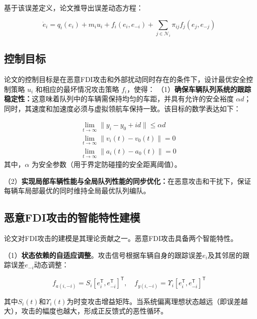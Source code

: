 \documentclass[10.5pt,a4paper,twoside,twocolumn]{ctexart}
\newcommand{\T}{\mathsf{T}}
\begin{document}
基于该误差定义，论文推导出误差动态方程：

\begin{equation}
\dot{e}_i = q_i(e_i) + m_i u_i + f_i(e_i, e_{-i}) + \sum_{j\in\mathcal{N}_i} \pi_{ij} f_j(e_j, e_{-j})
\label{eq:wcdt}
\end{equation}

\subsection{\heiti{} 控制目标}
论文的控制目标是在恶意FDI攻击和外部扰动同时存在的条件下，设计最优安全控制策略 $u_i$ 和相应的最坏情况攻击策略 $f_i$，使得：
（1）\textbf{确保车辆队列系统的跟踪稳定性：}这意味着队列中的车辆需保持均匀的车距，并具有允许的安全裕度 $\alpha d$；同时，其速度和加速度必须与虚拟领航车保持一致。该目标的数学表达如下：

\begin{equation}
	\begin{aligned}
	& \lim_{t \to \infty} \|y_i - y_0 + id\| \le \alpha d \\
	& \lim_{t \to \infty} \|v_i(t) - v_0(t)\| = 0 \\
	& \lim_{t \to \infty} \|a_i(t) - a_0(t)\| = 0 \quad
    \end{aligned}
\end{equation}
其中，$\alpha$ 为安全参数（用于界定防碰撞的安全距离阈值）。

（2）\textbf{实现局部车辆性能与全局队列性能的同步优化：}在恶意攻击和干扰下，保证每辆车局部最优的同时维持全局最优队列编队。

\subsection{\heiti{} 恶意FDI攻击的智能特性建模}

论文对FDI攻击的建模是其理论贡献之一。恶意FDI攻击具备两个智能特性。

（1）\textbf{状态依赖的自适应调整}。攻击信号根据车辆自身的跟踪误差$e_i$及其邻居的跟踪误差$e_{-i}$动态调整：

\begin{equation}
f_{a(i,-i)} = S_i \left[ e_i^{\T}, e_{-i}^{\T} \right]^{\T},\quad
f_{y(i,-i)} = \Upsilon_i \left[ e_i^{\T}, e_{-i}^{\T} \right]^{\T}
\label{eq:attack}
\end{equation}

其中$S_i(t)$和$\Upsilon_i(t)$为时变攻击增益矩阵。当系统偏离理想状态越远（即误差越大），攻击的幅度也越大，形成正反馈式的恶性循环。
\end{document}
